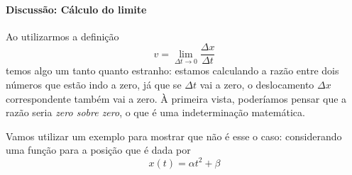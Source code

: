\paragraph{Discussão: Cálculo do limite}

Ao utilizarmos a definição
\begin{equation*}
  v = \lim_{\Delta t \to 0} \frac{\Delta x}{\Delta t}
\end{equation*}
%
temos algo um tanto quanto estranho: estamos calculando a razão entre dois números que estão indo a zero, já que se $\Delta t$ vai a zero, o deslocamento $\Delta x$ correspondente também vai a zero. À primeira vista, poderíamos pensar que a razão seria \emph{zero sobre zero}, o que é uma indeterminação matemática.

Vamos utilizar um exemplo para mostrar que não é esse o caso: considerando uma função para a posição que é dada por
\begin{equation}\label{Eq:FormaFuncCalcDeriv}
    x(t) = \alpha t^2 + \beta
\end{equation}

